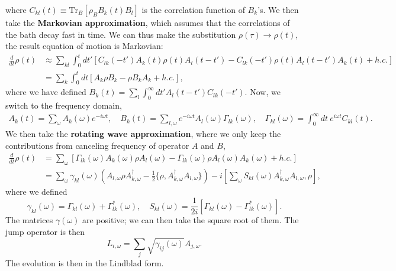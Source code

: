 \documentclass{SciPost}
\begin{document}
where $C_{kl}(t) \equiv \mathrm{Tr}_B[\rho_B B_k(t) B_l ]$ is the correlation function of $B_k$'s.  We then take the \textbf{Markovian approximation}, which assumes that the correlations of the bath decay fast in time. We can thus make the substitution $\rho(\tau) \rightarrow \rho(t)$, the result equation of motion is Markovian:
\begin{equation}
\begin{aligned}
	\frac{d}{dt} \rho(t) &\approx \sum_{kl}\int_{0}^{t}dt' \left[C_{lk}(-t') A_k(t)\rho(t)A_l(t-t') - C_{lk}(-t')\rho(t)A_l(t-t')A_k(t)+h.c.\right] \\
	&= \sum_{k} \int_0^t dt \left[A_k \rho B_{k}-\rho B_{k} A_k+h.c.\right],
\end{aligned}
\end{equation}
where we have defined $B_{k}(t) = \sum_l \int_0^{\infty} dt' A_l(t-t')C_{lk}(-t')$. Now, we switch to the frequency domain,
\begin{equation*}
\begin{aligned}
	A_k(t) = \sum_\omega A_{k}(\omega) e^{-i\omega t}, \quad
	B_k(t) = \sum_{l,\omega} e^{-i\omega t} A_l(\omega)\Gamma_{lk}(\omega), \quad
	\Gamma_{kl}(\omega) = \int_0^\infty dt\ e^{i\omega t}C_{kl}(t).
\end{aligned}
\end{equation*}
We then take the \textbf{rotating wave approximation}, where we only keep the contributions from canceling frequency of operator $A$ and $B$,
\begin{equation}
\begin{aligned}
	\frac{d}{dt}\rho(t) &= \sum_{\omega} \left[\Gamma_{lk}(\omega) A_k(\omega) \rho A_l(\omega) - \Gamma_{lk}(\omega)\rho A_l(\omega) A_k(\omega) + h.c. \right] \\
	&= \sum_{\omega} \gamma_{kl}(\omega)(A_{l,\omega}\rho A_{k,\omega}^\dagger-\frac{1}{2}\{\rho,A_{k,\omega}^\dagger A_{l,\omega}\}) -i\left[\sum_{\omega}S_{kl}(\omega)A_{k,\omega}^\dagger A_{l,\omega},\rho\right],
\end{aligned}
\end{equation}
where we defined 
\begin{equation}
	\gamma_{kl}(\omega) = \Gamma_{kl}(\omega) +\Gamma^*_{lk}(\omega),\quad 
	S_{kl}(\omega) = \frac{1}{2i}[\Gamma_{kl}(\omega) - \Gamma^*_{lk}(\omega)].
\end{equation}
The matrices $\gamma(\omega)$ are positive; we can then take the square root of them. The jump operator is then 
$$L_{i,\omega} = \sum_j \sqrt{\gamma_{ij}(\omega)}A_{j,\omega}.$$ 
The evolution is then in the Lindblad form.
\end{document}
